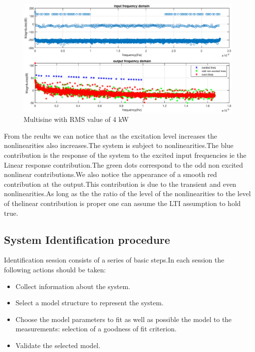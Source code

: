 \documentclass[a4paper,12pt]{article}
\numberwithin{equation}{section}
\begin{document}
\begin{figure}[H]
    \includegraphics[scale=0.6]{fdomain_input_rms_4000.eps}
    \centering
    \caption{Multisine with RMS value of 4 kW}
    \label{fig:MS_4.0}
\end{figure}

From the reults we can notice that as the excitation level increases the nonlinearities also increases.The system is subject to nonlinearities.The blue contribution is the response of the system to the excited input frequencies ie the Linear response contribution.The green dots correspond to the odd non excited nonlinear contributions.We also notice the appearance of a smooth red contribution at the output.This contribution is due to the transient and even nonlinearities.As long as the the ratio of the level of the nonlinearities to the level of thelinear contribution is proper one can assume the LTI assumption to hold true.




\subsection{System Identification procedure}
Identification session consists of a series of basic steps.In each session the following actions should be taken:
\begin{itemize}
    \item Collect information about the system.
    \item Select a model structure to represent the system.
    \item Choose the model parameters to fit as well as possible the model to the measurements:
selection of a goodness of fit criterion.
     \item Validate the selected model.
\end{itemize}
\end{document}
